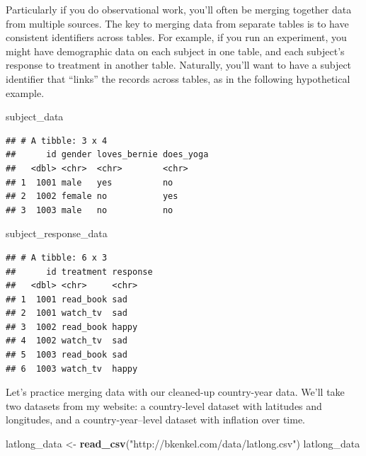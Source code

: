 \documentclass[
  12pt,
  oneside,openany]{book}
\newenvironment{Shaded}{\begin{snugshade}}{\end{snugshade}}
\newcommand{\KeywordTok}[1]{\textcolor[rgb]{0.13,0.29,0.53}{\textbf{#1}}}
\newcommand{\NormalTok}[1]{#1}
\newcommand{\StringTok}[1]{\textcolor[rgb]{0.31,0.60,0.02}{#1}}
\begin{document}
Particularly if you do observational work, you'll often be merging together data from multiple sources.
The key to merging data from separate tables is to have consistent identifiers across tables. For example, if you run an experiment, you might have demographic data on each subject in one table, and each subject's response to treatment in another table. Naturally, you'll want to have a subject identifier that ``links'' the records across tables, as in the following hypothetical example.

\begin{Shaded}
\begin{Highlighting}[]
\NormalTok{subject\_data}
\end{Highlighting}
\end{Shaded}

\begin{verbatim}
## # A tibble: 3 x 4
##      id gender loves_bernie does_yoga
##   <dbl> <chr>  <chr>        <chr>    
## 1  1001 male   yes          no       
## 2  1002 female no           yes      
## 3  1003 male   no           no
\end{verbatim}

\begin{Shaded}
\begin{Highlighting}[]
\NormalTok{subject\_response\_data}
\end{Highlighting}
\end{Shaded}

\begin{verbatim}
## # A tibble: 6 x 3
##      id treatment response
##   <dbl> <chr>     <chr>   
## 1  1001 read_book sad     
## 2  1001 watch_tv  sad     
## 3  1002 read_book happy   
## 4  1002 watch_tv  sad     
## 5  1003 read_book sad     
## 6  1003 watch_tv  happy
\end{verbatim}

Let's practice merging data with our cleaned-up country-year data. We'll take two datasets from my website: a country-level dataset with latitudes and longitudes, and a country-year--level dataset with inflation over time.

\begin{Shaded}
\begin{Highlighting}[]
\NormalTok{latlong\_data \textless{}{-}}\StringTok{ }\KeywordTok{read\_csv}\NormalTok{(}\StringTok{"http://bkenkel.com/data/latlong.csv"}\NormalTok{)}
\NormalTok{latlong\_data}
\end{Highlighting}
\end{Shaded}
\end{document}
